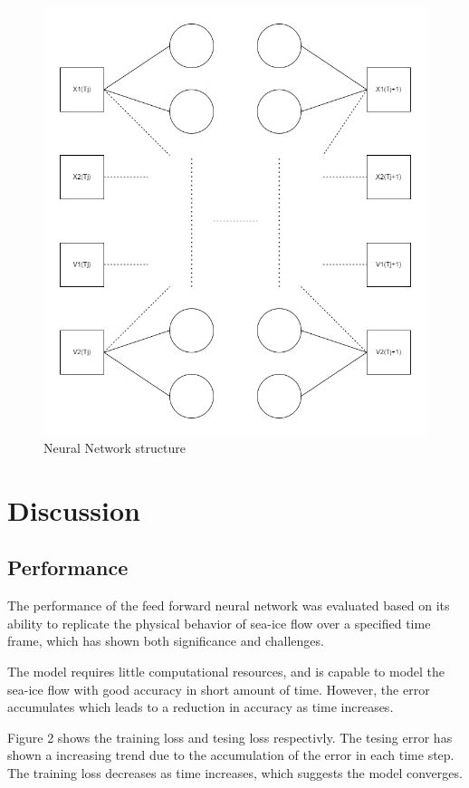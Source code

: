 \documentclass[12pt, a4paper]{article}
\begin{document}
\begin{figure}
    \centering
    \includegraphics[scale=0.3]{../NN_graph.png}
    \caption[]{Neural Network structure}
    \label{fig:neural_network}
\end{figure}

\section{Discussion}
\subsection{Performance}
The performance of the feed forward neural network was evaluated based on its ability to replicate the physical behavior of sea-ice flow over a specified time frame, which has shown both significance and challenges. 

The model requires little computational resources, and is capable to model the sea-ice flow with good accuracy in short amount of time. However, the error accumulates which leads to a reduction in accuracy as time increases.

Figure 2 shows the training loss and tesing loss respectivly. The tesing error has shown a increasing trend due to the accumulation of the error in each time step. The training loss decreases as time increases, which suggests the model converges.
\end{document}
